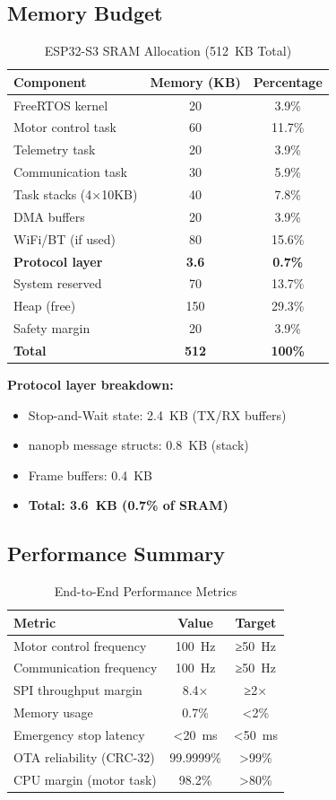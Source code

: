 \documentclass[12pt,letterpaper]{article}
\begin{document}
\subsection{Memory Budget}

\begin{table}[H]
\centering
\caption{ESP32-S3 SRAM Allocation (512~KB Total)}
\begin{tabular}{lcc}
\toprule
\textbf{Component} & \textbf{Memory (KB)} & \textbf{Percentage} \\
\midrule
FreeRTOS kernel & 20 & 3.9\% \\
Motor control task & 60 & 11.7\% \\
Telemetry task & 20 & 3.9\% \\
Communication task & 30 & 5.9\% \\
Task stacks (4×10KB) & 40 & 7.8\% \\
DMA buffers & 20 & 3.9\% \\
WiFi/BT (if used) & 80 & 15.6\% \\
\textbf{Protocol layer} & \textbf{3.6} & \textbf{0.7\%} \\
System reserved & 70 & 13.7\% \\
Heap (free) & 150 & 29.3\% \\
Safety margin & 20 & 3.9\% \\
\midrule
\textbf{Total} & \textbf{512} & \textbf{100\%} \\
\bottomrule
\end{tabular}
\end{table}

\textbf{Protocol layer breakdown:}
\begin{itemize}
    \item Stop-and-Wait state: 2.4~KB (TX/RX buffers)
    \item nanopb message structs: 0.8~KB (stack)
    \item Frame buffers: 0.4~KB
    \item \textbf{Total: 3.6~KB (0.7\% of SRAM)}
\end{itemize}

\subsection{Performance Summary}

\begin{table}[H]
\centering
\caption{End-to-End Performance Metrics}
\begin{tabular}{lcc}
\toprule
\textbf{Metric} & \textbf{Value} & \textbf{Target} \\
\midrule
Motor control frequency & 100~Hz & ≥50~Hz \\
Communication frequency & 100~Hz & ≥50~Hz \\
SPI throughput margin & 8.4× & ≥2× \\
Memory usage & 0.7\% & <2\% \\
Emergency stop latency & <20~ms & <50~ms \\
OTA reliability (CRC-32) & 99.9999\% & >99\% \\
CPU margin (motor task) & 98.2\% & >80\% \\
\bottomrule
\end{tabular}
\end{table}
\end{document}
